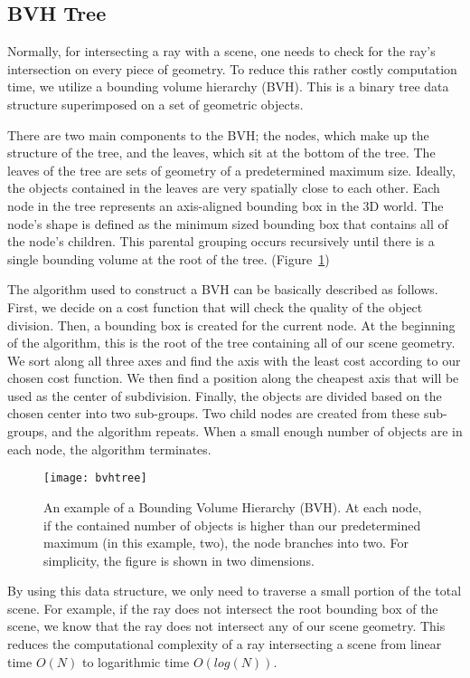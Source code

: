 \subsection{BVH Tree}
 Normally, for intersecting a ray with a scene, one needs to check for the ray's intersection on every piece of geometry.
 To reduce this rather costly computation time, we utilize a bounding volume hierarchy (BVH).
 This is a binary tree data structure superimposed on a set of geometric objects.
 
 There are two main components to the BVH; the nodes, which make up the structure of the tree, and the leaves, which sit at the bottom of the tree.
 The leaves of the tree are sets of geometry of a predetermined maximum size.
 Ideally, the objects contained in the leaves are very spatially close to each other.
 Each node in the tree represents an axis-aligned bounding box in the 3D world.
 The node's shape is defined as the minimum sized bounding box that contains all of the node's children.
 This parental grouping occurs recursively until there is a single bounding volume at the root of the tree. (Figure~\ref{fig:bvhtree})
 
 The algorithm used to construct a BVH can be basically described as follows.
 First, we decide on a cost function that will check the quality of the object division.
 Then, a bounding box is created for the current node.
 At the beginning of the algorithm, this is the root of the tree containing all of our scene geometry.
 We sort along all three axes and find the axis with the least cost according to our chosen cost function.
 We then find a position along the cheapest axis that will be used as the center of subdivision.
 Finally, the objects are divided based on the chosen center into two sub-groups.
 Two child nodes are created from these sub-groups, and the algorithm repeats.
 When a small enough number of objects are in each node, the algorithm terminates.
 
 \begin{figure}
 \texttt{[image: bvhtree]}
 \caption[BVH Tree]{An example of a Bounding Volume Hierarchy (BVH). At each node, if the contained number of objects is higher than our predetermined maximum (in this example, two), the node branches into two. For simplicity, the figure is shown in two dimensions. \autocite{ray1}}
 \label{fig:bvhtree}
 \end{figure}
 
 
 By using this data structure, we only need to traverse a small portion of the total scene.
 For example, if the ray does not intersect the root bounding box of the scene, we know that the ray does not intersect any of our scene geometry.
 This reduces the computational complexity of a ray intersecting a scene from linear time $O(N)$ to logarithmic time $O(log(N))$.
 
